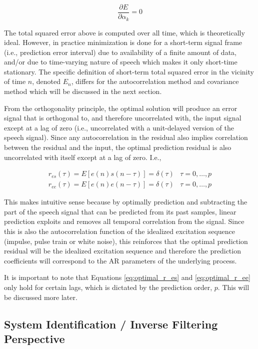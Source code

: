 \begin{equation}
	    \frac{\partial E}{\partial \alpha_k}=0
\end{equation}

The total squared error above is computed over all time, which is theoretically ideal. However, in practice minimization is done for a short-term signal frame (i.e., prediction error interval) due to availability of a finite amount of data, and/or due to time-varying nature of speech which makes it only short-time stationary. The specific definition of short-term total squared error in the vicinity of time $n$, denoted $E_n$, differs for the autocorrelation method and covariance method which will be discussed in the next section.

From the orthogonality principle, the optimal solution will produce an error signal that is orthogonal to, and therefore uncorrelated with, the input signal except at a lag of zero (i.e., uncorrelated with a unit-delayed version of the speech signal). Since any autocorrelation in the residual also implies correlation between the residual and the input, the optimal prediction residual is also uncorrelated with itself except at a lag of zero. I.e.,

\begin{eqnarray}
	r_{es}(\tau) = E\left[e(n)s(n-\tau)\right]=\delta(\tau) & \tau=0,\dots,p \label{eq:optimal_r_es} \\
	r_{ee}(\tau) = E\left[e(n)e(n-\tau)\right]=\delta(\tau)  & \tau=0,\dots,p  \label{eq:optimal_r_ee}
\end{eqnarray}

This makes intuitive sense because by optimally prediction and subtracting the part of the speech signal that can be predicted from its past samples, linear prediction exploits and removes all temporal correlation from the signal. Since this is also the autocorrelation function of the idealized excitation sequence (impulse, pulse train or white noise), this reinforces that the optimal prediction residual will be the idealized excitation sequence and therefore the prediction coefficients will correspond to the AR parameters of the underlying process.

It is important to note that Equations  \ref{eq:optimal_r_es} and \ref{eq:optimal_r_ee} only hold for certain lags, which is dictated by the prediction order, $p$. This will be discussed more later.


\subsection{System Identification / Inverse Filtering Perspective} \label{lp_inverse_filtering_perspective}

